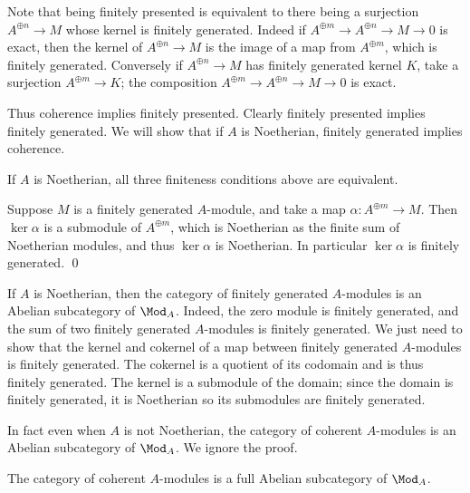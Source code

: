 Note that being finitely presented is equivalent to there being a surjection $A^{\oplus n}\to M$ whose kernel is finitely generated.
Indeed if $A^{\oplus m}\to A^{\oplus n}\to M\to0$ is exact, then the kernel of $A^{\oplus n}\to M$ is the image of a map from $A^{\oplus m}$, which is finitely generated.
Conversely if $A^{\oplus n}\to M$ has finitely generated kernel $K$, take a surjection $A^{\oplus m}\to K$; the composition $A^{\oplus m}\to A^{\oplus n}\to M\to0$ is exact.

Thus coherence implies finitely presented.
Clearly finitely presented implies finitely generated.
We will show that if $A$ is Noetherian, finitely generated implies coherence.

\bprop

    If $A$ is Noetherian, all three finiteness conditions above are equivalent.

\eprop

\bproof

    Suppose $M$ is a finitely generated $A$-module, and take a map $\alpha\colon A^{\oplus m}\to M$.
    Then $\ker\alpha$ is a submodule of $A^{\oplus m}$, which is Noetherian as the finite sum of Noetherian modules, and thus $\ker\alpha$ is Noetherian.
    In particular $\ker\alpha$ is finitely generated.
    \qed

\eproof

If $A$ is Noetherian, then the category of finitely generated $A$-modules is an Abelian subcategory of $\Mod_A$.
Indeed, the zero module is finitely generated, and the sum of two finitely generated $A$-modules is finitely generated.
We just need to show that the kernel and cokernel of a map between finitely generated $A$-modules is finitely generated.
The cokernel is a quotient of its codomain and is thus finitely generated.
The kernel is a submodule of the domain; since the domain is finitely generated, it is Noetherian so its submodules are finitely generated.

In fact even when $A$ is not Noetherian, the category of coherent $A$-modules is an Abelian subcategory of $\Mod_A$.
We ignore the proof.

\bprop

    The category of coherent $A$-modules is a full Abelian subcategory of $\Mod_A$.

\eprop

